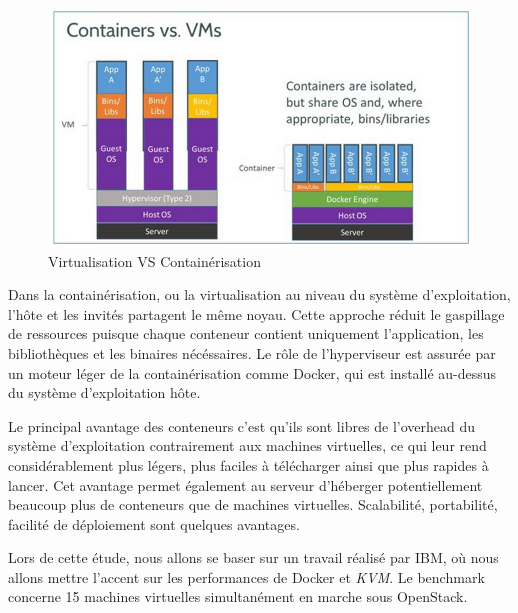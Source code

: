 \begin{onehalfspace}
\begin{figure}[H]
\centering
\includegraphics [scale=0.5]{chapitre2/assets/vm-container.png}
\caption{Virtualisation VS Containérisation}
\end{figure}


Dans la containérisation, ou la virtualisation au niveau du système d'exploitation, l'hôte et les invités partagent le même noyau. Cette approche réduit le gaspillage de ressources puisque chaque conteneur contient uniquement l'application, les bibliothèques et les binaires nécéssaires. Le rôle de l'hyperviseur est assurée par un moteur léger de la containérisation comme Docker, qui est installé au-dessus du système d'exploitation hôte.

Le principal avantage des conteneurs c'est qu'ils sont libres de l'overhead du système d'exploitation contrairement aux machines virtuelles, ce qui leur rend considérablement plus légers, plus faciles à télécharger ainsi que plus rapides à lancer. Cet avantage permet également au serveur d'héberger potentiellement beaucoup plus de conteneurs que de machines virtuelles. Scalabilité, portabilité, facilité de déploiement sont quelques avantages.


Lors de cette étude, nous allons se baser sur un travail réalisé par IBM\cite{ibm-benchmark-docker}, où nous allons mettre l'accent sur les performances de Docker et \emph{KVM}. Le benchmark concerne 15 machines virtuelles simultanément en marche sous OpenStack.


\def\arraystretch{1.4}%


{
\begin{center}
\begin{table}[H]

	\centering


\end{table}
\end{center}}
\end{onehalfspace}
